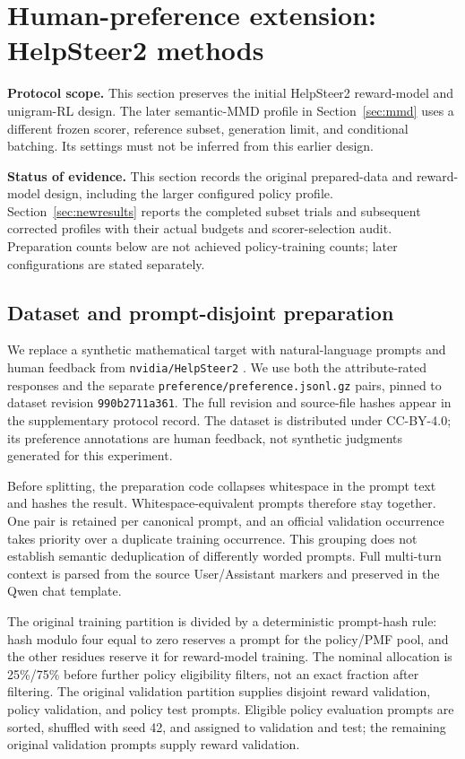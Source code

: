 \section{Human-preference extension: HelpSteer2 methods}
\label{sec:helpsteer}
\noindent\textbf{Protocol scope.} This section preserves the initial
HelpSteer2 reward-model and unigram-RL design. The later semantic-MMD
profile in Section~\ref{sec:mmd} uses a different frozen scorer,
reference subset, generation limit, and conditional batching. Its
settings must not be inferred from this earlier design.

\noindent\textbf{Status of evidence.} This section records the original
prepared-data and reward-model design, including the larger configured
policy profile. Section~\ref{sec:newresults} reports the completed subset
trials and subsequent corrected profiles with their actual budgets and
scorer-selection audit. Preparation counts below are not achieved
policy-training counts; later configurations are stated separately.

\subsection{Dataset and prompt-disjoint preparation}
We replace a synthetic mathematical target with natural-language prompts
and human feedback from \texttt{nvidia/HelpSteer2}
\cite{wang2024helpsteer,wang2024preference}. We use both the attribute-rated
responses and the separate \texttt{preference/preference.jsonl.gz} pairs,
pinned to dataset revision \texttt{990b2711a361}. The full revision and
source-file hashes appear in the supplementary protocol record. The
dataset is distributed under CC-BY-4.0; its preference annotations are
human feedback, not synthetic judgments generated for this experiment.

Before splitting, the preparation code collapses whitespace in the prompt
text and hashes the result. Whitespace-equivalent prompts therefore stay
together. One pair is retained per canonical prompt, and an official
validation occurrence takes priority over a duplicate training occurrence.
This grouping does not establish semantic deduplication of differently
worded prompts. Full multi-turn context is parsed from the source
User/Assistant markers and preserved in the Qwen chat template.

The original training partition is divided by a deterministic prompt-hash
rule: hash modulo four equal to zero reserves a prompt for the policy/PMF
pool, and the other residues reserve it for reward-model training.
The nominal allocation is 25\%/75\% before further policy eligibility
filters, not an exact fraction after filtering. The original validation
partition supplies disjoint reward validation, policy validation, and
policy test prompts. Eligible policy evaluation prompts are sorted,
shuffled with seed 42, and assigned to validation and test; the remaining
original validation prompts supply reward validation.

